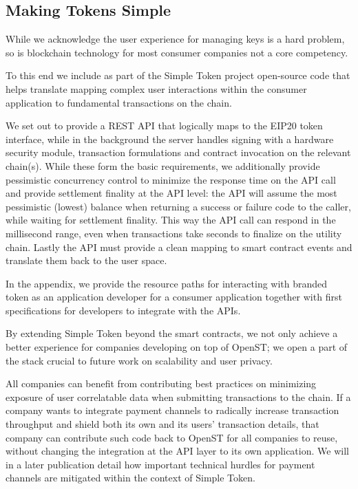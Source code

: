 \documentclass[12pt,a4paper, twocolumn]{article}
\begin{document}
\subsection{Making Tokens Simple}
While we acknowledge the user experience for managing keys is a hard problem, so is blockchain technology for most consumer companies not a core competency. \par
To this end we include as part of the Simple Token project open-source code that helps translate mapping complex user interactions within the consumer application to fundamental transactions on the chain. \par
We set out to provide a REST API that logically maps to the EIP20 token interface, while in the background the server handles signing with a hardware security module, transaction formulations and contract invocation on the relevant chain(s).  While these form the basic requirements, we additionally provide pessimistic concurrency control to minimize the response time on the API call and provide settlement finality at the API level: the API will assume the most pessimistic (lowest) balance when returning a success or failure code to the caller, while waiting for settlement finality. This way the API call can respond in the millisecond range, even when transactions take seconds to finalize on the utility chain.  Lastly the API must provide a clean mapping to smart contract events and translate them back to the user space. \par
In the appendix, we provide the resource paths for interacting with branded token as an application developer for a consumer application together with first specifications for developers to integrate with the APIs. \par
By extending Simple Token beyond the smart contracts, we not only achieve a better experience for companies developing on top of OpenST; we open a part of the stack crucial to future work on scalability and user privacy. \par
All companies can benefit from contributing best practices on minimizing exposure of user correlatable data when submitting transactions to the chain.  If a company wants to integrate payment channels to radically increase transaction throughput and shield both its own and its users’ transaction details, that company can contribute such code back to OpenST for all companies to reuse, without changing the integration at the API layer to its own application.  We will in a later publication detail how important technical hurdles for payment channels are mitigated within the context of Simple Token. \par
\end{document}
